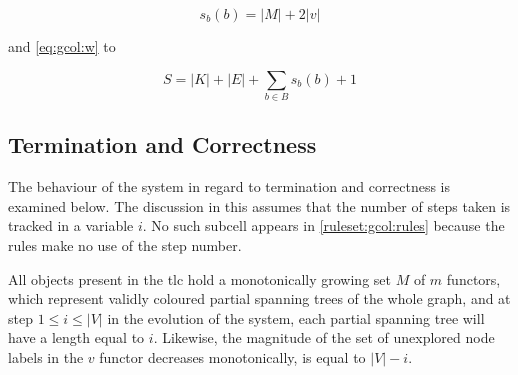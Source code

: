 \begin{equation}
    s_b(b) = |M| + 2 |v|
\end{equation}

and \cref{eq:gcol:w} to

\begin{equation}
    S = |K| + |E| + \sum_{b \in B}s_b(b) + 1
\end{equation}

\subsection{\label{sec:gcol:termination}Termination and Correctness}
The behaviour of the system in regard to termination and correctness is examined below.  The discussion in this  assumes that the number of steps taken is tracked in a variable \(i\).  No such subcell appears in \cref{ruleset:gcol:rules} because the rules make no use of the step number.

\begin{theorem}\label{theorem:gcol:grow}
All \bo{} objects present in the \gls{tlc} hold a monotonically growing set \(M\) of \(m\) \glspl{functor}, which represent validly coloured partial spanning trees of the whole graph, and at step \(1 \leq i \leq |V|\) in the evolution of the system, each partial spanning tree will have a length equal to \(i\).  Likewise, the magnitude of the set of unexplored node labels in the \(v\) \gls{functor} decreases monotonically, is equal to \(|V| - i\).
\end{theorem}

